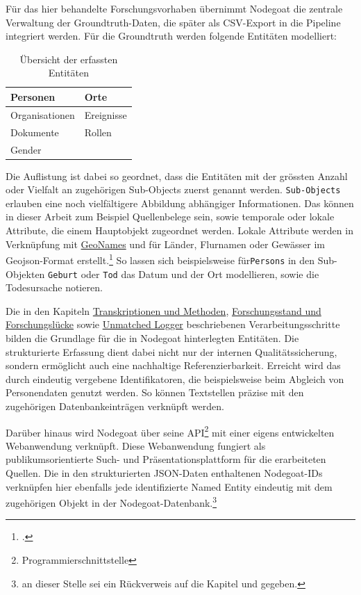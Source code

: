 \documentclass[12pt, a4paper, ngerman, bidi=default]{article}
\let\cite\footcite
\newcommand{\code}[1]{\colorbox{VeryLightGray}{\texttt{#1}}} %
\begin{document}
Für das hier behandelte Forschungsvorhaben übernimmt Nodegoat die zentrale Verwaltung der Groundtruth-Daten, die später als CSV-Export in die Pipeline integriert werden. 
Für die Groundtruth werden folgende Entitäten modelliert:

\begin{table}[h]
  \renewcommand{\arraystretch}{1.5}
  \centering
  \begin{tabular}{|p{}|p{}|}
    \hline
    Personen & Orte \\ \hline
    Organisationen & Ereignisse \\ \hline
    Dokumente & Rollen \\ \hline
    Gender & \\ \hline
  \end{tabular}
  \caption{\small Übersicht der erfassten Entitäten}
\end{table}

Die Auflistung ist dabei so geordnet, dass die Entitäten mit der grössten Anzahl oder Vielfalt an zugehörigen Sub-Objects zuerst genannt werden. \code{Sub-Objects} erlauben eine
noch vielfältigere Abbildung abhängiger Informationen. Das können in dieser Arbeit zum Beispiel Quellenbelege sein, sowie temporale oder lokale Attribute, die einem Hauptobjekt zugeordnet werden. Lokale Attribute 
werden in Verknüpfung mit \hyperref[subsec:geonames]{GeoNames} und für Länder, Flurnamen oder Gewässer im Geojson-Format erstellt.\cite[Weiterführend:][]{thomson_geographic_2017} So lassen sich beispielsweise für\code{Persons}
in den Sub-Objekten \code{Geburt} oder \code{Tod} das Datum und der Ort modellieren, sowie die Todesursache notieren.

Die in den Kapiteln \hyperref[section:Transkriptionen_Methoden]{Transkriptionen und Methoden}, \hyperref[subsec:forschungsstand]{Forschungsstand und Forschungslücke} 
sowie \hyperref[subsec:unmatched_logger]{Unmatched Logger} beschriebenen Verarbeitungsschritte bilden die Grundlage für die in Nodegoat hinterlegten Entitäten.
Die strukturierte Erfassung dient dabei nicht nur der internen Qualitätssicherung, sondern ermöglicht auch eine nachhaltige Referenzierbarkeit. Erreicht wird das durch eindeutig 
vergebene Identifikatoren, die beispielsweise beim Abgleich von Personendaten genutzt werden. So können  Textstellen präzise mit den zugehörigen Datenbankeinträgen verknüpft werden.

Darüber hinaus wird Nodegoat über seine API\footnote{Programmierschnittstelle} mit einer eigens entwickelten Webanwendung verknüpft. Diese Webanwendung fungiert als publikumsorientierte 
Such- und Präsentationsplattform für die erarbeiteten Quellen. Die in den strukturierten JSON-Daten enthaltenen Nodegoat-IDs verknüpfen hier ebenfalls jede identifizierte Named Entity eindeutig mit dem 
zugehörigen Objekt in der Nodegoat-Datenbank.\footnote{an dieser Stelle sei ein Rückverweis auf die Kapitel  und  gegeben.} 
\end{document}
